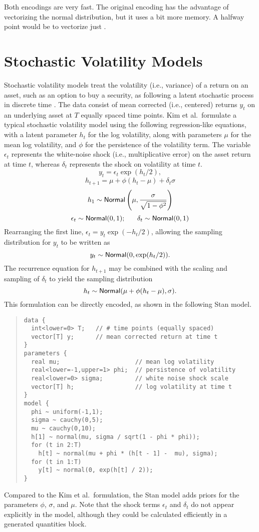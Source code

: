 Both encodings are very fast.  The original encoding has the advantage
of vectorizing the normal distribution, but it uses a bit more memory.
A halfway point would be to vectorize just .



\section{Stochastic Volatility Models}

Stochastic volatility models treat the volatility (i.e., variance) of
a return on an asset, such as an option to buy a security, as
following a latent stochastic process in discrete time
\citep{KimShephardChib:1998}.  The data consist of mean corrected
(i.e., centered) returns $y_t$ on an underlying asset at $T$ equally
spaced time points.  Kim et al.\ formulate a typical stochastic
volatility model using the following regression-like equations, with a
latent parameter $h_t$ for the log volatility, along with parameters
$\mu$ for the mean log volatility, and $\phi$ for the persistence of
the volatility term.  The variable $\epsilon_t$ represents the
white-noise shock (i.e., multiplicative error) on the asset return at
time $t$, whereas $\delta_t$ represents the shock on volatility at
time $t$.
\[
y_t = \epsilon_t \exp(h_t / 2),
\]
\[
h_{t+1} = \mu + \phi (h_t - \mu) + \delta_t \sigma
\]
\[
h_1 \sim \mbox{\sf Normal}\left( \mu, \frac{\sigma}{\sqrt{1 - \phi^2}} \right)
\]
\[
\epsilon_t \sim \distro{Normal}(0,1); \ \ \ \ \  \delta_t \sim \distro{Normal}(0,1)
\]
%
Rearranging the first line, $\epsilon_t = y_t \exp(-h_t / 2)$,
allowing the sampling distribution for $y_t$ to be written as
\[ 
y_t \sim \mbox{\sf Normal}(0,\exp(h_t/2)).
\]
The recurrence equation for $h_{t+1}$ may be combined with the
scaling and sampling of $\delta_t$ to yield the sampling distribution
\[
h_t \sim \mbox{\sf Normal}(\mu + \phi(h_t - \mu), \sigma).
\]
This formulation can be directly encoded, as shown in the following
Stan model.
%
\begin{quote}
\begin{Verbatim}[fontsize=\small]
data {
  int<lower=0> T;   // # time points (equally spaced)
  vector[T] y;      // mean corrected return at time t
}
parameters {
  real mu;                     // mean log volatility
  real<lower=-1,upper=1> phi;  // persistence of volatility
  real<lower=0> sigma;         // white noise shock scale
  vector[T] h;                 // log volatility at time t
}
model {
  phi ~ uniform(-1,1);
  sigma ~ cauchy(0,5);
  mu ~ cauchy(0,10);  
  h[1] ~ normal(mu, sigma / sqrt(1 - phi * phi));
  for (t in 2:T)
    h[t] ~ normal(mu + phi * (h[t - 1] -  mu), sigma);
  for (t in 1:T)
    y[t] ~ normal(0, exp(h[t] / 2));
}
\end{Verbatim}
\end{quote}
%
Compared to the Kim et al.\ formulation, the Stan model adds priors
for the parameters $\phi$, $\sigma$, and $\mu$.  Note that the shock
terms $\epsilon_t$ and $\delta_t$ do not appear explicitly in the
model, although they could be calculated efficiently in a generated
quantities block.

